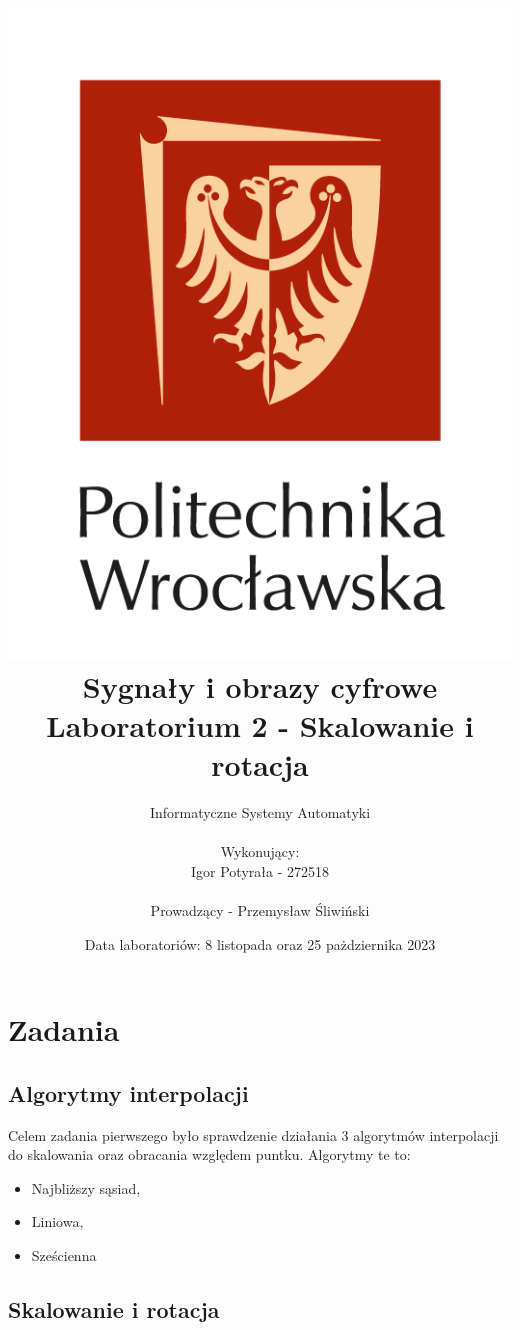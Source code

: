 \documentclass[14pt]{article}
\title{
    \includegraphics[scale=0.5]{images/logo-pwr-pion.png}
    \vspace{1cm}
    \\
    {\textbf{
    \titlefont Sygnały i obrazy cyfrowe
    \\ Laboratorium 2 - Skalowanie i rotacja
    }}
}
\author{
    Informatyczne Systemy Automatyki
    \\
    \\ Wykonujący:
    \\ Igor Potyrała - 272518
    \\
    \\ Prowadzący - Przemysław Śliwiński
}
\date{Data laboratoriów: 8 listopada oraz 25 pażdziernika 2023}
\begin{document}
\maketitle
\newpage

\section{Zadania}
\subsection{Algorytmy interpolacji}
Celem zadania pierwszego było sprawdzenie działania 3 algorytmów interpolacji
do skalowania oraz obracania względem puntku. Algorytmy te to:
\begin{itemize}
    \item Najbliższy sąsiad,
    \item Liniowa,
    \item Sześcienna
\end{itemize}

\subsection{Skalowanie i rotacja}
\end{document}

